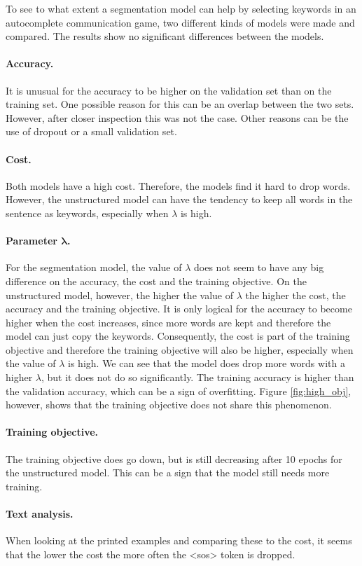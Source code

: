 To see to what extent a segmentation model can help by selecting keywords in an autocomplete communication game, two different kinds of models were made and compared.
The results show no significant differences between the models.

\paragraph{Accuracy.}
It is unusual for the accuracy to be higher on the validation set than on the training set. 
One possible reason for this can be an overlap between the two sets. 
However, after closer inspection this was not the case.
Other reasons can be the use of dropout or a small validation set. 

\paragraph{Cost.}
Both models have a high cost.
Therefore, the models find it hard to drop words. 
However, the unstructured model can have the tendency to keep all words in the sentence as keywords, especially when $\lambda$ is high.

\paragraph{Parameter $\boldsymbol{\lambda}$.}
For the segmentation model, the value of $\lambda$ does not seem to have any big difference on the accuracy, the cost and the training objective.
On the unstructured model, however, the higher the value of $\lambda$ the higher the cost, the accuracy and the training objective.
It is only logical for the accuracy to become higher when the cost increases, since more words are kept and therefore the model can just copy the keywords.
Consequently, the cost is part of the training objective and therefore the training objective will also be higher, especially when the value of $\lambda$ is high.
We can see that the model does drop more words with a higher $\lambda$, but it does not do so significantly. 
The training accuracy is higher than the validation accuracy, which can be a sign of overfitting. 
Figure \ref{fig:high_obj}, however, shows that the training objective does not share this phenomenon.


\paragraph{Training objective.}
The training objective does go down, but is still decreasing after 10 epochs for the unstructured model.
This can be a sign that the model still needs more training. 

\paragraph{Text analysis.}
When looking at the printed examples and comparing these to the cost, it seems that the lower the cost the more often the <sos> token is dropped. 